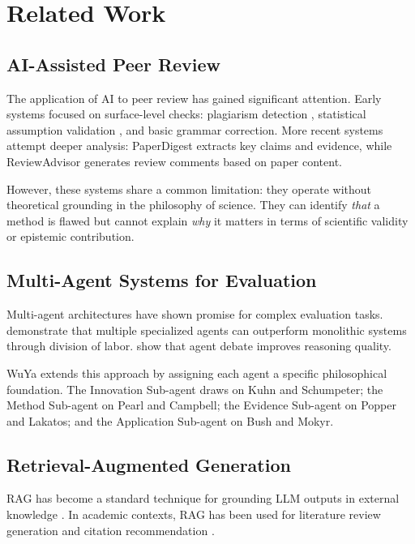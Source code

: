 \documentclass[11pt,a4paper]{article}
\newcommand{\rag}{RAG}
\begin{document}
\section{Related Work}
\label{sec:related-work}

\subsection{AI-Assisted Peer Review}

The application of AI to peer review has gained significant attention. Early systems focused on surface-level checks: plagiarism detection \citep{mozgovoy2020automatic}, statistical assumption validation \citep{nuijten2016prevalence}, and basic grammar correction. More recent systems attempt deeper analysis: PaperDigest \citep{kang2018peerread} extracts key claims and evidence, while ReviewAdvisor \citep{yuan2022reviewadvisor} generates review comments based on paper content.

However, these systems share a common limitation: they operate without theoretical grounding in the philosophy of science. They can identify \textit{that} a method is flawed but cannot explain \textit{why} it matters in terms of scientific validity or epistemic contribution.

\subsection{Multi-Agent Systems for Evaluation}

Multi-agent architectures have shown promise for complex evaluation tasks. \citet{du2023improving} demonstrate that multiple specialized agents can outperform monolithic systems through division of labor. \citet{liang2024encouraging} show that agent debate improves reasoning quality.

WuYa extends this approach by assigning each agent a specific philosophical foundation. The Innovation Sub-agent draws on Kuhn and Schumpeter; the Method Sub-agent on Pearl and Campbell; the Evidence Sub-agent on Popper and Lakatos; and the Application Sub-agent on Bush and Mokyr.

\subsection{Retrieval-Augmented Generation}

\rag{} has become a standard technique for grounding LLM outputs in external knowledge \citep{lewis2020retrieval}. In academic contexts, \rag{} has been used for literature review generation \citep{shah2023ai} and citation recommendation \citep{zhang2023citation}.
\end{document}

